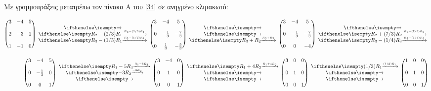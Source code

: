 \documentclass[12pt]{extreport}
\begin{document}
Με γραμμοπράξεις μετατρέπω τον πίνακα A του \eqref{34} σε ανηγμένο κλιμακωτό:

\begin{equation*}
    \begin{aligned}
        \begin{pmatrix}
            3 & -4 & 5 \\[0.4cm]
            2 & -3 & 1 \\[0.4cm]
            1 & -1 & 0
        \end{pmatrix}\rowops{,R_{2}-(2/3)R_{1},R_{3}-(1/3)R_{1}}
        \begin{pmatrix}
            3 & -4           & 5            \\[0.4cm]
            0 & -\frac{1}{3} & -\frac{7}{3} \\[0.4cm]
            0 & \frac{1}{3}  & -\frac{5}{3}
        \end{pmatrix}\rowops{,,R_{3}+R_{2}}
        \begin{pmatrix}
            3 & -4           & 5            \\[0.4cm]
            0 & -\frac{1}{3} & -\frac{7}{3} \\[0.4cm]
            0 & 0            & -4
        \end{pmatrix}\rowops{,R_{2}+(7/3)R_{2},R_{3}-(1/4)R_{3}} \\[0.4cm]
        \begin{pmatrix}
            3 & -4           & 5 \\[0.4cm]
            0 & -\frac{1}{3} & 0 \\[0.4cm]
            0 & 0            & 1
        \end{pmatrix}\rowops{R_{1}-5R_{3},-3R_{2},}
        \begin{pmatrix}
            3 & -4 & 0 \\[0.4cm]
            0 & 1  & 0 \\[0.4cm]
            0 & 0  & 1
        \end{pmatrix}
        \rowops{R_{1}+4R_{2},,}
        \begin{pmatrix}
            3 & 0 & 0 \\[0.4cm]
            0 & 1 & 0 \\[0.4cm]
            0 & 0 & 1
        \end{pmatrix}
        \rowops{(1/3)R_{1},,}
        \begin{pmatrix}
            1 & 0 & 0 \\[0.4cm]
            0 & 1 & 0 \\[0.4cm]
            0 & 0 & 1
        \end{pmatrix}
    \end{aligned}
\end{equation*}
\end{document}
